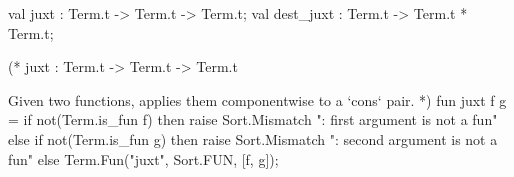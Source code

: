\nwenddocs{}\plusendmoddef\nwstartdeflinemarkup{}\nwenddeflinemarkup
val juxt : Term.t -> Term.t -> Term.t;
val dest_juxt : Term.t -> Term.t * Term.t;
\nwendcode{}\nwdocspar

\nwenddocs{}\endmoddef\nwstartdeflinemarkup{}\nwenddeflinemarkup
(* juxt : Term.t -> Term.t -> Term.t

Given two functions, applies them componentwise to a `cons`
pair. *)
fun juxt f g =
  if not(Term.is_fun f)
  then raise Sort.Mismatch ": first argument is not a fun"
  else if not(Term.is_fun g)
  then raise Sort.Mismatch ": second argument is not a fun"
  else Term.Fun("juxt", Sort.FUN, [f, g]);


